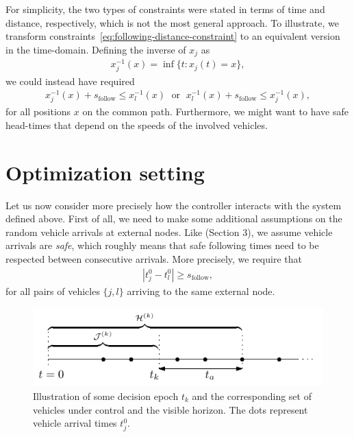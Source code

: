\documentclass{article}
\theoremstyle{definition}
\theoremstyle{plain}
\begin{document}
For simplicity, the two types of constraints were stated in terms of time and
distance, respectively, which is not the most general approach. To illustrate,
we transform constraints~\eqref{eq:following-distance-constraint} to an
equivalent version in the time-domain. Defining the inverse of $x_{j}$ as
\begin{align}
  x_{j}^{-1}(x) = \inf \{ t: x_{j}(t) = x \} ,
\end{align}
we could instead have required
\begin{align}
  x_{j}^{-1}(x) + s_{\text{follow}} \leq x_{l}^{-1}(x) \; \text{ or } \; x_{l}^{-1}(x) + s_{\text{follow}} \leq x_{j}^{-1}(x) ,
\end{align}
for all positions $x$ on the common path. Furthermore, we might want to
have safe head-times that depend on the speeds of the involved vehicles.

\section{Optimization setting}

Let us now consider more precisely how the controller interacts with the system
defined above. First of all, we need to make some additional assumptions on the
random vehicle arrivals at external nodes. Like
\cite{limpensOnlinePlatoonForming2023} (Section 3), we assume vehicle arrivals
are \textit{safe}, which roughly means that safe following times need to be
respected between consecutive arrivals. More precisely, we require that
\begin{align}
  |t_{j}^{0} - t_{l}^{0}| \geq s_{\text{follow}} ,
\end{align}
for all pairs of vehicles $\{j,l\}$ arriving to the same external node.

\begin{figure}
  \centering
  \includegraphics[width=1.0\textwidth]{figures/sequential-decision-process.pdf}
  \caption{Illustration of some decision epoch $t_{k}$ and the corresponding set
    of vehicles under control and the visible horizon. The dots represent vehicle
    arrival times $t_{j}^{0}$.}
  \label{fig:sequential-decision-process}
\end{figure}
\end{document}

